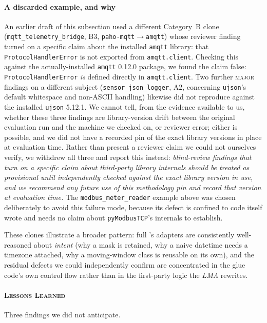 \paragraph{A discarded example, and why}
An earlier draft of this subsection used a different Category~B clone (\texttt{mqtt\_telemetry\_bridge}, B3, \texttt{paho-mqtt}$\to$\texttt{amqtt}) whose reviewer finding turned on a specific claim about the installed \texttt{amqtt} library: that \texttt{ProtocolHandlerError} is not exported from \texttt{amqtt.client}. Checking this against the actually-installed \texttt{amqtt} 0.12.0 package, we found the claim false: \texttt{ProtocolHandlerError} \emph{is} defined directly in \texttt{amqtt.client}. Two further \textsc{major} findings on a different subject (\texttt{sensor\_json\_logger}, A2, concerning \texttt{ujson}'s default whitespace and non-ASCII handling) likewise did not reproduce against the installed \texttt{ujson} 5.12.1. We cannot tell, from the evidence available to us, whether these three findings are library-version drift between the original evaluation run and the machine we checked on, or reviewer error; either is possible, and we did not have a recorded pin of the exact library versions in place at evaluation time. Rather than present a reviewer claim we could not ourselves verify, we withdrew all three and report this instead: \emph{blind-review findings that turn on a specific claim about third-party library internals should be treated as provisional until independently checked against the exact library version in use, and we recommend any future use of this methodology pin and record that version at evaluation time.} The \texttt{modbus\_meter\_reader} example above was chosen deliberately to avoid this failure mode, because its defect is confined to code \sys itself wrote and needs no claim about \texttt{pyModbusTCP}'s internals to establish.

These clones illustrate a broader pattern: full \sys's adapters are consistently well-reasoned about \emph{intent} (why a mask is retained, why a naive datetime needs a timezone attached, why a moving-window class is reusable on its own), and the residual defects we could independently confirm are concentrated in the glue code's own control flow rather than in the first-party logic the \emph{LMA} rewrites.

\paragraph{\textsc{Lessons Learned}}
Three findings we did not anticipate.

